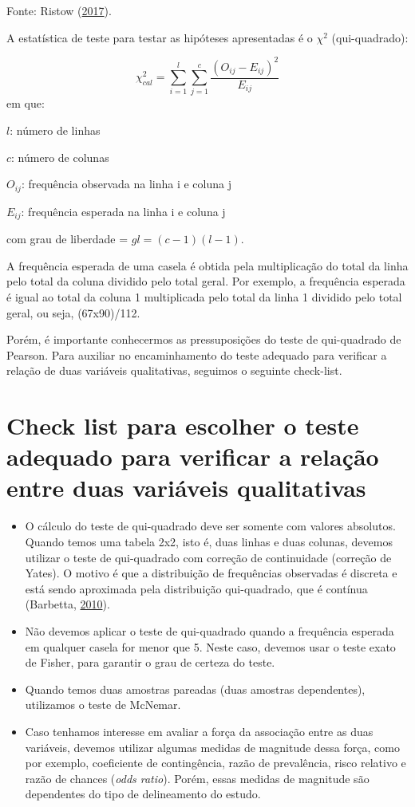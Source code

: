 \documentclass[12pt,brazil,oneside]{book}
\begin{document}
Fonte: Ristow (\protect\hyperlink{ref-Ristow2017}{2017}).

A estatística de teste para testar as hipóteses apresentadas é o \(\chi^2\) (qui-quadrado):

\[
\chi^2_{cal}=\sum_{i=1}^{l}\sum_{j=1}^{c}\frac{(O_{ij}-E_{ij})^2}{E_{ij}}
\]
em que:

\(l\): número de linhas

\(c\): número de colunas

\(O_{ij}\): frequência observada na linha i e coluna j

\(E_{ij}\): frequência esperada na linha i e coluna j

com grau de liberdade = \(gl = (c-1)(l-1)\).

A frequência esperada de uma casela é obtida pela multiplicação do total da linha pelo total da coluna dividido pelo total geral. Por exemplo, a frequência esperada é igual ao total da coluna 1 multiplicada pelo total da linha 1 dividido pelo total geral, ou seja, (67x90)/112.

Porém, é importante conhecermos as pressuposições do teste de qui-quadrado de Pearson. Para auxiliar no encaminhamento do teste adequado para verificar a relação de duas variáveis qualitativas, seguimos o seguinte check-list.

\hypertarget{check-list-para-escolher-o-teste-adequado-para-verificar-a-relacao-entre-duas-variaveis-qualitativas}{%
\section{Check list para escolher o teste adequado para verificar a relação entre duas variáveis qualitativas}\label{check-list-para-escolher-o-teste-adequado-para-verificar-a-relacao-entre-duas-variaveis-qualitativas}}

\begin{itemize}
\item
  O cálculo do teste de qui-quadrado deve ser somente com valores absolutos. Quando temos uma tabela 2x2, isto é, duas linhas e duas colunas, devemos utilizar o teste de qui-quadrado com correção de continuidade (correção de Yates). O motivo é que a distribuição de frequências observadas é discreta e está sendo aproximada pela distribuição qui-quadrado, que é contínua (Barbetta, \protect\hyperlink{ref-barbetta1988}{2010}).
\item
  Não devemos aplicar o teste de qui-quadrado quando a frequência esperada em qualquer casela for menor que 5. Neste caso, devemos usar o teste exato de Fisher, para garantir o grau de certeza do teste.
\item
  Quando temos duas amostras pareadas (duas amostras dependentes), utilizamos o teste de McNemar.
\item
  Caso tenhamos interesse em avaliar a força da associação entre as duas variáveis, devemos utilizar algumas medidas de magnitude dessa força, como por exemplo, coeficiente de contingência, razão de prevalência, risco relativo e razão de chances (\emph{odds ratio}). Porém, essas medidas de magnitude são dependentes do tipo de delineamento do estudo.
\end{itemize}
\end{document}

